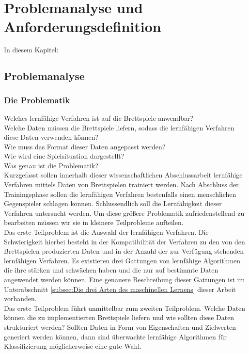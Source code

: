 \chapter{Problemanalyse und Anforderungsdefinition}
\label{cha:pua}

In diesem Kapitel: 
\section{Problemanalyse}

\subsection{Die Problematik}
Welches lernfähige Verfahren ist auf die Brettspiele anwendbar? \\
Welche Daten müssen die Brettspiele liefern, sodass die lernfähigen Verfahren diese Daten verwenden können? \\
Wie muss das Format dieser Daten angepasst werden? \\
Wie wird eine Spielsituation dargestellt? \\

Was genau ist die Problematik?\\
Kurzgefasst sollen innerhalb dieser wissenschaftlichen Abschlussarbeit lernfähige Verfahren mittels Daten von Brettspielen trainiert werden. Nach Abschluss der Trainingsphase sollen die lernfähigen Verfahren bestenfalls einen menschlichen Gegenspieler schlagen können. Schlussendlich soll die Lernfähigkeit dieser Verfahren untersucht werden. Um diese größere Problematik zufriedenstellend zu bearbeiten müssen wir sie in kleinere Teilprobleme aufteilen. \\

Das erste Teilproblem ist die Auswahl der lernfähigen Verfahren. Die Schwierigkeit hierbei besteht in der Kompatibilität der Verfahren zu den von den Brettspielen produzierten Daten und in der Anzahl der zur Verfügung stehenden lernfähigen Verfahren. Es existieren drei Gattungen von lernfähige Algorithmen die ihre stärken und schwächen haben und die nur auf bestimmte Daten angewendet werden können. Eine genauere Beschreibung dieser Gattungen ist im Unterabschnitt \ref{subsec:Die drei Arten des maschinellen Lernens} dieser Arbeit vorhanden. \\

Das erste Teilproblem führt unmittelbar zum zweiten Teilproblem. Welche Daten können die zu implementierten Brettspiele liefern und wie sollten diese Daten strukturiert werden? Sollten Daten in Form von Eigenschaften und Zielwerten generiert werden können, dann sind überwachte lernfähige Algorithmen für Klassifizierung möglicherweise eine gute Wahl. 

